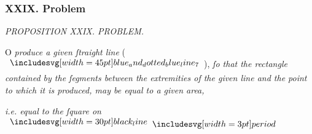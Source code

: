 \documentclass[11pt,preview]{standalone}
\begin{document}
\subsubsection{XXIX. Problem}

\begin{minipage}[t]{0.54\textwidth}
    \begin{center}
        \textit{PROPOSITION XXIX. PROBLEM.}\label{book6pr29} \\
    \end{center}

    \hfill

    \begin{center}
        \raggedright \lettrine[lines=3, loversize=1, nindent=0pt]{}{}O \textit{produce a given ſtraight line} (\hspace{-1ex}$\bimg{blue_and_dotted_blue_line_7}$\hspace{-1ex}), \textit{ſo that the rectangle contained by the ſegments between the extremities of the given line and the point to which it is produced, may be equal to a given area,}
    \end{center}
    \textit{i.e. equal to the ſquare on} $\blackline \bperiod$
\end{minipage}%
\hfill
\begin{minipage}[t]{0.43\textwidth}
    \vspace{20pt}
    
\end{minipage}

\hfill

\hfill
\end{document}
